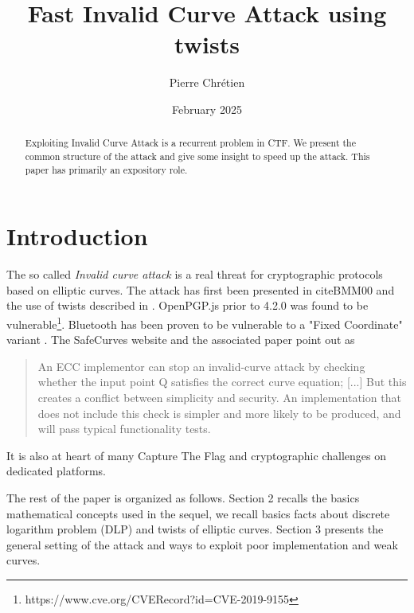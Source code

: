 \documentclass[10pt]{article}
\theoremstyle{definition}
\begin{document}

\author{Pierre Chrétien}
\title{Fast Invalid Curve Attack using twists}
\date{February 2025}
\maketitle
\begin{abstract}
Exploiting Invalid Curve Attack is a recurrent problem in CTF. 
We present the common structure of the attack and give some insight to speed up the attack. 
This paper has primarily an expository role.
\end{abstract}


\section{Introduction}

The so called \textsl{Invalid curve attack} is a real threat for cryptographic protocols based on elliptic curves.
The attack has first been presented in cite{BMM00} and the use of twists described in \cite{FLRV08}.
OpenPGP.js prior to 4.2.0 was found to be vulnerable\footnote{https://www.cve.org/CVERecord?id=CVE-2019-9155}. 
Bluetooth has been proven to be vulnerable to a "Fixed Coordinate" variant  \cite{cryptoeprint:2019/1043}.
The SafeCurves website and the associated paper \cite{cryptoeprint:2024/1265} point out as 
\begin{quote}
An ECC implementor can stop an invalid-curve attack by checking whether the input point Q satisfies the correct curve equation; [...]
But this creates a conflict between simplicity and security. An implementation that does not include this check is simpler and more likely to be produced, and will pass typical functionality tests. 
\end{quote}

\noindent It is also at heart of many Capture The Flag and cryptographic challenges on dedicated platforms.


\noindent The rest of the paper is organized as follows.
Section 2 recalls the basics mathematical concepts used  in the sequel, we recall basics facts about discrete logarithm problem (DLP) and twists of elliptic curves.	
Section 3 presents the general setting of the attack and ways to exploit poor implementation and weak curves.
\end{document}
